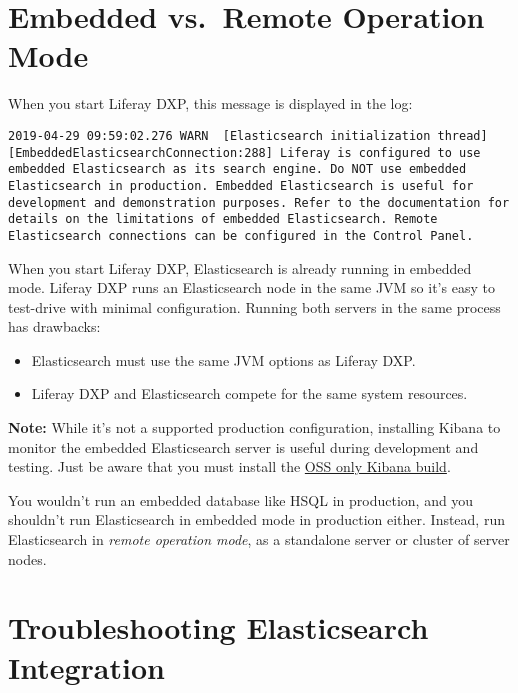 \section{Embedded vs.~Remote Operation
Mode}\label{embedded-vs.-remote-operation-mode}

When you start Liferay DXP, this message is displayed in the log:

\begin{verbatim}
2019-04-29 09:59:02.276 WARN  [Elasticsearch initialization thread][EmbeddedElasticsearchConnection:288] Liferay is configured to use embedded Elasticsearch as its search engine. Do NOT use embedded Elasticsearch in production. Embedded Elasticsearch is useful for development and demonstration purposes. Refer to the documentation for details on the limitations of embedded Elasticsearch. Remote Elasticsearch connections can be configured in the Control Panel.
\end{verbatim}

When you start Liferay DXP, Elasticsearch is already running in embedded
mode. Liferay DXP runs an Elasticsearch node in the same JVM so it's
easy to test-drive with minimal configuration. Running both servers in
the same process has drawbacks:

\begin{itemize}
\tightlist
\item
  Elasticsearch must use the same JVM options as Liferay DXP.
\item
  Liferay DXP and Elasticsearch compete for the same system resources.
\end{itemize}

\noindent\hrulefill

\textbf{Note:} While it's not a supported production configuration,
installing Kibana to monitor the embedded Elasticsearch server is useful
during development and testing. Just be aware that you must install the
\href{https://www.elastic.co/downloads/kibana-oss}{OSS only Kibana
build}.

\noindent\hrulefill

You wouldn't run an embedded database like HSQL in production, and you
shouldn't run Elasticsearch in embedded mode in production either.
Instead, run Elasticsearch in \emph{remote operation mode}, as a
standalone server or cluster of server nodes.

\section{Troubleshooting Elasticsearch
Integration}\label{troubleshooting-elasticsearch-integration}

